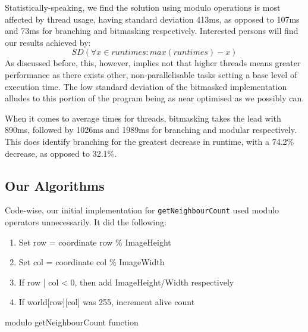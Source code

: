 \documentclass[twoside,twocolumn]{article}
\begin{document}
Statistically-speaking, we find the solution using 
modulo operations is most affected by thread usage, having standard deviation 413ms, as opposed to 107ms 
and 73ms for branching and bitmasking respectively. Interested persons will find our results achieved by:
\[SD(\forall x \in runtimes : max(runtimes) - x)\]
As discussed before, this, however, implies not that higher threads means greater 
performance as there exists other, non-parallelisable tasks setting a base level of execution time. 
The low standard deviation of the bitmasked implementation alludes to this portion of the program being as 
near optimised as we possibly can. 

When it comes to average times for threads, bitmasking takes the lead with
890ms, followed by 1026ms and 1989ms for branching and modular respectively. This does identify branching for the 
greatest decrease in runtime, with a 74.2\% decrease, as opposed to 32.1\%.

\subsection{Our Algorithms}

Code-wise, our initial implementation for \texttt{getNeighbourCount} used modulo operators unnecessarily. It did the following:
\begin{enumerate}[noitemsep]
  \item Set row = coordinate row \% ImageHeight
  \item Set col = coordinate col \% ImageWidth
  \item If row | col < 0, then add ImageHeight/Width respectively
  \item If world[row][col] was 255, increment alive count
\end{enumerate}

\begin{algorithm}
  \caption{modulo getNeighbourCount function}
\end{algorithm}
\end{document}
